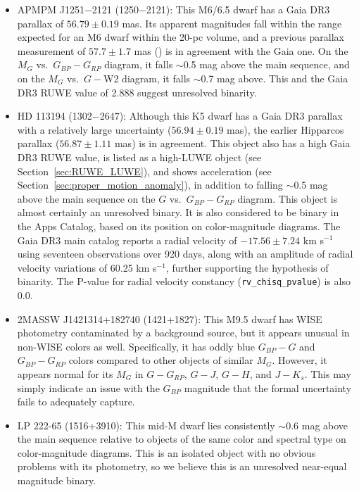 \documentclass[twocolumn,tighten,twocolappendix]{aastex631}
\begin{document}
\begin{itemize}
\item APMPM J1251$-$2121 (1250$-$2121): This M6/6.5 dwarf has a Gaia DR3 parallax of $56.79{\pm}0.19$ mas. Its apparent magnitudes fall within the range expected for an M6 dwarf within the 20-pc volume, and a previous parallax measurement of $57.7{\pm}1.7$ mas (\citealt{winters2015}) is in agreement with the Gaia one. On the $M_G$ vs.\ $G_{BP}-G_{RP}$ diagram, it falls $\sim$0.5 mag above the main sequence, and on the $M_G$ vs.\ $G-$W2 diagram, it falls $\sim$0.7 mag above. This and the Gaia DR3 RUWE value of 2.888 suggest unresolved binarity. 

\item HD 113194 (1302$-$2647): Although this K5 dwarf has a Gaia DR3 parallax with a relatively large uncertainty ($56.94{\pm}0.19$ mas), the earlier Hipparcos parallax ($56.87{\pm}1.11$ mas) is in agreement. This object also has a high Gaia DR3 RUWE value, is listed as a high-LUWE object (see Section~\ref{sec:RUWE_LUWE}), and shows acceleration (see Section~\ref{sec:proper_motion_anomaly}), in addition to falling $\sim$0.5 mag above the main sequence on the $G$ vs.\ $G_{BP}-G_{RP}$ diagram. This object is almost certainly an unresolved binary. It is also considered to be binary in the Apps Catalog, based on its position on color-magnitude diagrams. The Gaia DR3 main catalog reports a radial velocity of $-17.56{\pm}7.24$ km s$^{-1}$ using seventeen observations over 920 days, along with an amplitude of radial velocity variations of 60.25 km s$^{-1}$, further supporting the hypothesis of binarity. The P-value for radial velocity constancy ({\tt rv\_chisq\_pvalue}) is also 0.0.

\item 2MASSW J1421314+182740 (1421+1827): This M9.5 dwarf has WISE photometry contaminated by a background source, but it appears unusual in non-WISE colors as well. Specifically, it has oddly blue $G_{BP}-G$ and $G_{BP}-G_{RP}$ colors compared to other objects of similar $M_G$. However, it appears normal for its $M_G$ in $G-G_{RP}$, $G-J$, $G-H$, and $J-K_s$. This may simply indicate an issue with the $G_{BP}$ magnitude that the formal uncertainty fails to adequately capture.

\item LP 222-65 (1516+3910): This mid-M dwarf lies consistently $\sim$0.6 mag above the main sequence relative to objects of the same color and spectral type on color-magnitude diagrams. This is an isolated object with no obvious problems with its photometry, so we believe this is an unresolved near-equal magnitude binary.


\end{itemize}
\end{document}
